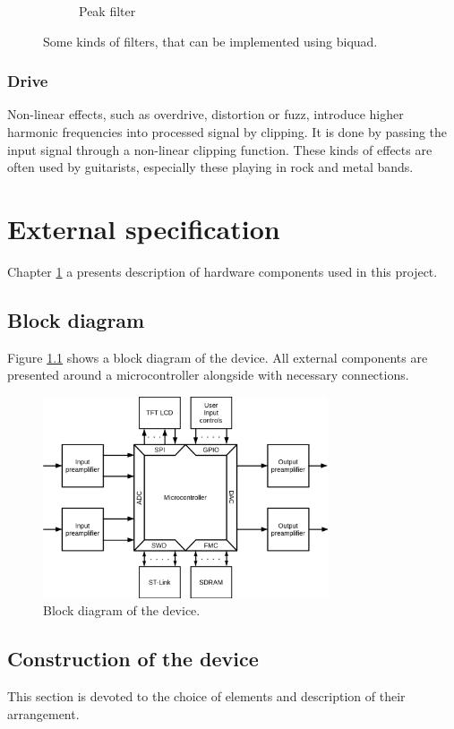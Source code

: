 \documentclass[a4paper,twoside,12pt]{book}
\begin{document}
\begin{figure}[H]
\begin{subfigure}[t]{0.4\textwidth}
        \label{fig:peak}
        \caption{Peak filter}
    \end{subfigure}
    \caption{Some kinds of filters, that can be implemented using biquad\cite{Zolzer2}.}
    \label{fig:biquad}
\end{figure}

\subsection{Drive}
Non-linear effects, such as overdrive, distortion or fuzz,
introduce higher harmonic frequencies into processed signal by clipping.
It is done by passing the input signal through a non-linear clipping function.
These kinds of effects are often used by guitarists,
especially these playing in rock and metal bands.


\chapter{External specification}\label{ch:external}
Chapter \ref{ch:external} a presents description of hardware components used in this project.

\section{Block diagram}
Figure \ref{fig:block} shows a block diagram of the device.
All external components are presented around a microcontroller
alongside with necessary connections.

\begin{figure}[H]
    \centering
    \includegraphics[width=0.75\textwidth]{images/Block}
    \caption{Block diagram of the device.}
    \label{fig:block}
\end{figure}

\section{Construction of the device}
This section is devoted to the choice of elements
and description of their arrangement.
\end{document}
